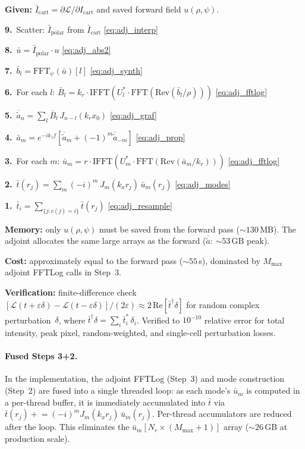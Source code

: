 \documentclass[11pt,a4paper]{article}
\begin{document}
\begin{tcolorbox}[title=Adjoint of \texttt{execute\_psf}]
\textbf{Given:} $\bar I_{\mathrm{cart}} = \partial\mathcal{L}/\partial I_{\mathrm{cart}}$
and saved forward field $u(\rho,\psi)$.

\medskip
\textbf{9.}\ Scatter: $\bar I_{\mathrm{polar}}$ from $\bar I_{\mathrm{cart}}$
\hfill\eqref{eq:adj_interp}

\textbf{8.}\ $\bar u = \bar I_{\mathrm{polar}}\cdot u$
\hfill\eqref{eq:adj_abs2}

\textbf{7.}\ $\bar b_l = \mathrm{FFT}_\psi(\bar u)[l]$
\hfill\eqref{eq:adj_synth}

\textbf{6.}\ For each $l$: $\bar B_l = k_r \cdot \mathrm{IFFT}(U_l^*\cdot\mathrm{FFT}(\mathrm{Rev}(\bar b_l/\rho)))$
\hfill\eqref{eq:adj_fftlog}

\textbf{5.}\ $\overline{\tilde a}_n = \sum_l \bar B_l\,J_{n-l}(k_r x_0)$
\hfill\eqref{eq:adj_graf}

\textbf{4.}\ $\bar a_m = e^{-ik_z f}[\overline{\tilde a}_m + (-1)^m\overline{\tilde a}_{-m}]$
\hfill\eqref{eq:adj_prop}

\textbf{3.}\ For each $m$: $\bar u_m = r\cdot\mathrm{IFFT}(U_m^*\cdot\mathrm{FFT}(\mathrm{Rev}(\bar a_m/k_r)))$
\hfill\eqref{eq:adj_fftlog}

\textbf{2.}\ $\bar t(r_j) = \sum_m (-i)^m\,J_m(k_x r_j)\,\bar u_m(r_j)$
\hfill\eqref{eq:adj_modes}

\textbf{1.}\ $\bar t_i = \sum_{\{j:c(j)=i\}} \bar t(r_j)$
\hfill\eqref{eq:adj_resample}
\end{tcolorbox}

\noindent
\textbf{Memory:} only $u(\rho,\psi)$ must be saved from the forward pass
(${\sim}130$\,MB).  The adjoint allocates the same large arrays as the forward
($\overline{\tilde a}$: ${\sim}53$\,GB peak).

\noindent
\textbf{Cost:} approximately equal to the forward pass (${\sim}55$\,s), dominated
by $M_{\max}$ adjoint FFTLog calls in Step~3.

\noindent
\textbf{Verification:} finite-difference check
$[\mathcal{L}(t{+}\varepsilon\delta) - \mathcal{L}(t{-}\varepsilon\delta)]/(2\varepsilon)
\approx 2\,\mathrm{Re}[\bar t^\dagger\delta]$
for random complex perturbation~$\delta$, where $\bar t^\dagger\delta = \sum_i \bar t_i^*\,\delta_i$.
Verified to $10^{-10}$ relative error for total intensity, peak pixel,
random-weighted, and single-cell perturbation losses.

\paragraph{Fused Steps 3+2.}
In the implementation, the adjoint FFTLog (Step~3) and mode construction
(Step~2) are fused into a single threaded loop: as each mode's
$\bar u_m$ is computed in a per-thread buffer, it is immediately accumulated
into $\bar t$ via $\bar t(r_j) \mathrel{+}= (-i)^m J_m(k_x r_j)\,\bar u_m(r_j)$.
Per-thread accumulators are reduced after the loop.  This eliminates the
$\bar u_m[N_r \times (M_{\max}{+}1)]$ array (${\sim}26$\,GB at production scale).
\end{document}
